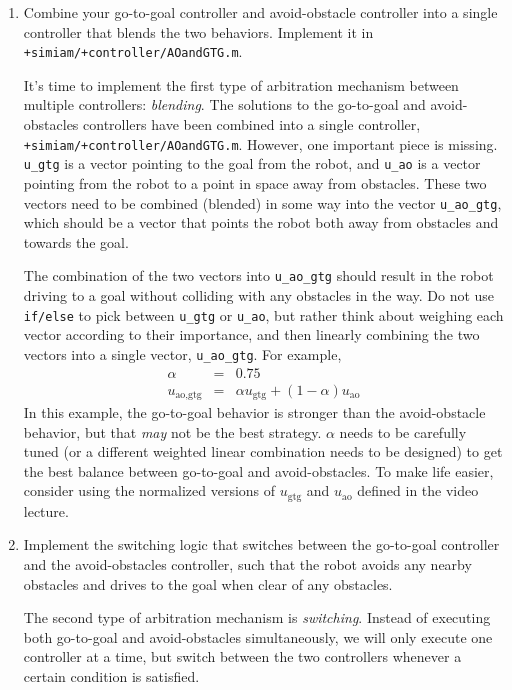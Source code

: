 \documentclass[10pt]{article}
\begin{document}
\begin{enumerate}
  \item Combine your go-to-goal controller and avoid-obstacle controller into a single controller that blends the two behaviors. Implement it in \texttt{+simiam/+controller/AOandGTG.m}.
  
  It's time to implement the first type of arbitration mechanism between multiple controllers: \textit{blending}. The solutions to the go-to-goal and avoid-obstacles controllers have been combined into a single controller, \texttt{+simiam/+controller/AOandGTG.m}. However, one important piece is missing. \texttt{u\_gtg} is a vector pointing to the goal from the robot, and \texttt{u\_ao} is a vector pointing from the robot to a point in space away from obstacles. These two vectors need to be combined (blended) in some way into the vector \texttt{u\_ao\_gtg}, which should be a vector that points the robot both away from obstacles and towards the goal.
  
  The combination of the two vectors into \texttt{u\_ao\_gtg} should result in the robot driving to a goal without colliding with any obstacles in the way. Do not use \texttt{if/else} to pick between \texttt{u\_gtg} or \texttt{u\_ao}, but rather think about weighing each vector according to their importance, and then linearly combining the two vectors into a single vector, \texttt{u\_ao\_gtg}. For example,
  \begin{eqnarray*}
    \alpha &=& 0.75 \\
    u_{\text{ao,gtg}} &=& \alpha u_{\text{gtg}}+(1-\alpha)u_{\text{ao}}
  \end{eqnarray*}
  In this example, the go-to-goal behavior is stronger than the avoid-obstacle behavior, but that \textit{may} not be the best strategy. $\alpha$ needs to be carefully tuned (or a different weighted linear combination needs to be designed) to get the best balance between go-to-goal and avoid-obstacles. To make life easier, consider using the normalized versions of $u_{\text{gtg}}$ and $u_{\text{ao}}$ defined in the video lecture.
  
  \item Implement the switching logic that switches between the go-to-goal controller and the avoid-obstacles controller, such that the robot avoids any nearby obstacles and drives to the goal when clear of any obstacles.
  
  The second type of arbitration mechanism is \textit{switching}. Instead of executing both go-to-goal and avoid-obstacles simultaneously, we will only execute one controller at a time, but switch between the two controllers whenever a certain condition is satisfied.
  

\end{enumerate}
\end{document}
